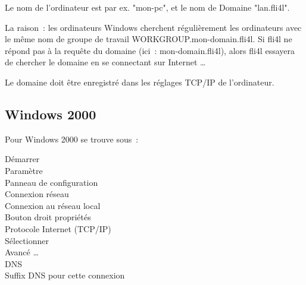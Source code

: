   Le nom de l'ordinateur est par ex. "mon-pc", et le nom de Domaine "lan.fli4l".


  La raison~: les ordinateurs Windows cherchent régulièrement les
  ordinateurs avec le même nom de groupe de travail WORKGROUP.mon-domain.fli4l.
  Si fli4l ne répond pas à la requête du domaine (ici~: mon-domain.fli4l),
  alors fli4l essayera de chercher le domaine en se connectant sur Internet \ldots

  Le domaine doit être enregistré dans les réglages TCP/IP de l'ordinateur.

  \subsection{Windows 2000}

  Pour Windows 2000 se trouve sous~:

  \noindent Démarrer \pfeil\\
  \hspace*{2ex}Paramètre \pfeil\\
  \hspace*{4ex}Panneau de configuration \pfeil\\
  \hspace*{6ex}Connexion réseau \pfeil\\
  \hspace*{8ex}Connexion au réseau local \pfeil\\
  \hspace*{10ex}Bouton droit propriétés  \pfeil\\
  \hspace*{12ex}Protocole Internet (TCP/IP) \pfeil\\
  \hspace*{14ex}Sélectionner \pfeil\\
  \hspace*{16ex}Avancé \ldots \pfeil\\
  \hspace*{18ex}DNS \pfeil\\
  \hspace*{20ex}Suffix DNS pour cette connexion \pfeil\\

